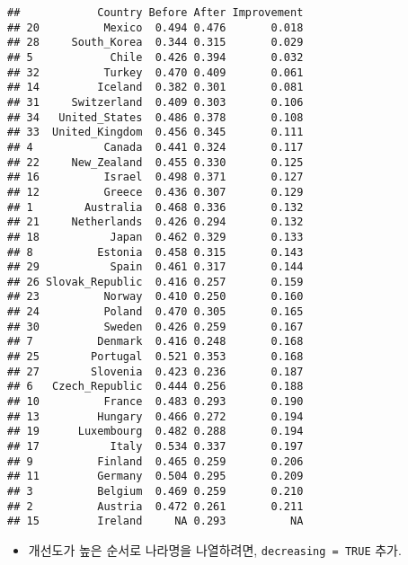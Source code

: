 \documentclass[
]{article}
\newenvironment{Shaded}{\begin{snugshade}}{\end{snugshade}}
\newcommand{\AttributeTok}[1]{\textcolor[rgb]{0.77,0.63,0.00}{#1}}
\newcommand{\ConstantTok}[1]{\textcolor[rgb]{0.00,0.00,0.00}{#1}}
\newcommand{\FunctionTok}[1]{\textcolor[rgb]{0.00,0.00,0.00}{#1}}
\newcommand{\NormalTok}[1]{#1}
\newcommand{\SpecialCharTok}[1]{\textcolor[rgb]{0.00,0.00,0.00}{#1}}
\providecommand{\tightlist}{%
  \setlength{\itemsep}{0pt}\setlength{\parskip}{0pt}}
\begin{document}
\begin{verbatim}
##            Country Before After Improvement
## 20          Mexico  0.494 0.476       0.018
## 28     South_Korea  0.344 0.315       0.029
## 5            Chile  0.426 0.394       0.032
## 32          Turkey  0.470 0.409       0.061
## 14         Iceland  0.382 0.301       0.081
## 31     Switzerland  0.409 0.303       0.106
## 34   United_States  0.486 0.378       0.108
## 33  United_Kingdom  0.456 0.345       0.111
## 4           Canada  0.441 0.324       0.117
## 22     New_Zealand  0.455 0.330       0.125
## 16          Israel  0.498 0.371       0.127
## 12          Greece  0.436 0.307       0.129
## 1        Australia  0.468 0.336       0.132
## 21     Netherlands  0.426 0.294       0.132
## 18           Japan  0.462 0.329       0.133
## 8          Estonia  0.458 0.315       0.143
## 29           Spain  0.461 0.317       0.144
## 26 Slovak_Republic  0.416 0.257       0.159
## 23          Norway  0.410 0.250       0.160
## 24          Poland  0.470 0.305       0.165
## 30          Sweden  0.426 0.259       0.167
## 7          Denmark  0.416 0.248       0.168
## 25        Portugal  0.521 0.353       0.168
## 27        Slovenia  0.423 0.236       0.187
## 6   Czech_Republic  0.444 0.256       0.188
## 10          France  0.483 0.293       0.190
## 13         Hungary  0.466 0.272       0.194
## 19      Luxembourg  0.482 0.288       0.194
## 17           Italy  0.534 0.337       0.197
## 9          Finland  0.465 0.259       0.206
## 11         Germany  0.504 0.295       0.209
## 3          Belgium  0.469 0.259       0.210
## 2          Austria  0.472 0.261       0.211
## 15         Ireland     NA 0.293          NA
\end{verbatim}

\begin{itemize}
\tightlist
\item
  개선도가 높은 순서로 나라명을 나열하려면, \texttt{decreasing\ =\ TRUE}
  추가.
\end{itemize}

\begin{Shaded}
\end{Shaded}
\end{document}
